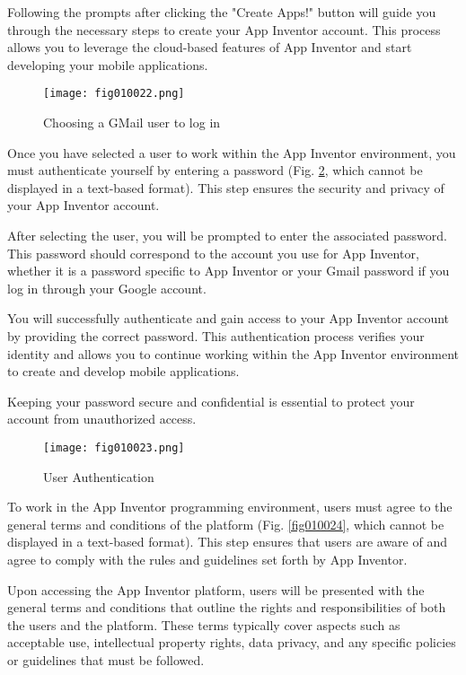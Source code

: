 Following the prompts after clicking the "Create Apps!" button will guide you through the necessary steps to create your App Inventor account. This process allows you to leverage the cloud-based features of App Inventor and start developing your mobile applications.

\begin{figure}[H]
   \centering
   \texttt{[image: fig010022.png]}
   \caption{Choosing a GMail user to log in}
\label{fig010022}
\end{figure}

Once you have selected a user to work within the App Inventor environment, you must authenticate yourself by entering a password (Fig. \ref{fig010023}, which cannot be displayed in a text-based format). This step ensures the security and privacy of your App Inventor account.

After selecting the user, you will be prompted to enter the associated password. This password should correspond to the account you use for App Inventor, whether it is a password specific to App Inventor or your Gmail password if you log in through your Google account.

You will successfully authenticate and gain access to your App Inventor account by providing the correct password. This authentication process verifies your identity and allows you to continue working within the App Inventor environment to create and develop mobile applications.

Keeping your password secure and confidential is essential to protect your account from unauthorized access.

\begin{figure}[H]
   \centering
   \texttt{[image: fig010023.png]}
   \caption{User Authentication}
\label{fig010023}
\end{figure}

To work in the App Inventor programming environment, users must agree to the general terms and conditions of the platform (Fig. \ref{fig010024}, which cannot be displayed in a text-based format). This step ensures that users are aware of and agree to comply with the rules and guidelines set forth by App Inventor.

Upon accessing the App Inventor platform, users will be presented with the general terms and conditions that outline the rights and responsibilities of both the users and the platform. These terms typically cover aspects such as acceptable use, intellectual property rights, data privacy, and any specific policies or guidelines that must be followed.

